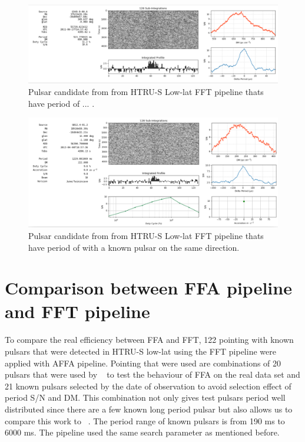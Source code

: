 \documentclass[thesis_msc.tex]{subfiles}
\begin{document}
\begin{figure}[h]
\centering
\includegraphics[width=1.0\textwidth]{figures/C1.png}
\caption{Pulsar candidate from from HTRU-S Low-lat FFT pipeline thats have period of ... . }\label{C1}
\end{figure}
 
 \begin{figure}[h]
\centering
\includegraphics[width=1.0\textwidth]{figures/C2.png}
\caption{Pulsar candidate from from HTRU-S Low-lat FFT pipeline thats have period of  with a known pulsar on the same direction.}\label{C2}
\end{figure}
    
\section{Comparison between FFA pipeline and FFT pipeline }
    \paragraph{} To compare the real efficiency between FFA and FFT, 122 pointing with known pulsars that were detected in HTRU-S low-lat using the FFT pipeline were applied with AFFA pipeline. Pointing that were used are combinations of 20 pulsars that were used by ~\citep{cameron2017investigation} to test the behaviour of FFA on the real data set and 21 known pulsars selected by the date of observation to avoid selection effect of period S/N and DM. This combination not only gives test pulsars period well distributed since there are a few known long period pulsar but also allows us to compare this work to ~\citep{cameron2017investigation}. The period range of known pulsars is from 190 ms to 6000 ms. The pipeline used the same search parameter as mentioned before. 
\end{document}
